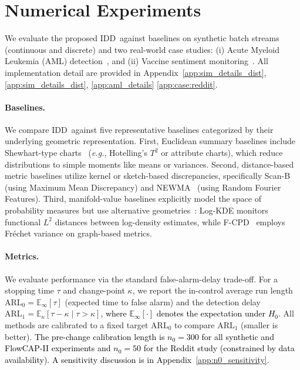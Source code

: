 \documentclass{article}
\newcommand{\eg}{\textit{e.g.}, \xspace}
\newcommand{\algoname}{\textsc{IDD}\xspace}
\newcommand{\rev}[1]{\textcolor{black}{#1}}
\theoremstyle{plain}
\theoremstyle{definition}
\theoremstyle{remark}
\begin{document}
\section{Numerical Experiments}
We evaluate the proposed \algoname\ against baselines on synthetic batch streams (continuous and discrete) and two real-world case studies: (i) Acute Myeloid Leukemia (AML) detection~\citep{aghaeepour2013critical}, and (ii) Vaccine sentiment monitoring~\citep{DVN/XJTBQM_2022}. 
All implementation detail are provided in Appendix~\ref{app:sim_details_dist}, \ref{app:sim_details_dist}, \ref{app:aml_details} \ref{app:case:reddit}. 

\paragraph{Baselines.}
We compare \algoname\ against five representative baselines categorized by their underlying geometric representation.
First, Euclidean summary baselines include Shewhart-type charts~\citep{xie2021sequential} (\eg Hotelling's $T^2$ or attribute charts), which reduce distributions to simple moments like means or variances.
Second, distance-based metric baselines utilize kernel or sketch-based discrepancies, specifically Scan-B~\citep{li2019scan} (using Maximum Mean Discrepancy) and NEWMA~\citep{keriven2020newma} (using Random Fourier Features).
Third, manifold-value baselines explicitly model the space of probability measures but use alternative geometries~\citep{ramsay2005functional}: Log-KDE monitors functional $L^2$ distances between log-density estimates, while F-CPD~\citep{dubey2020frechet} employs Fr\'echet variance on graph-based metrics.

\paragraph{Metrics.} We evaluate performance via the standard false-alarm-delay trade-off.
For a stopping time $\tau$ and change-point $\kappa$, we report the in-control average run length $\mathrm{ARL}_0=\mathbb E_{\infty}[\tau]$ (expected time to false alarm) and the detection delay $\mathrm{ARL}_1=\mathbb E_{\kappa}[\tau-\kappa\mid \tau>\kappa]$\rev{, where $\mathbb E_{\infty}[\cdot]$ denotes the 
expectation under $H_0$}.
All methods are calibrated to a fixed target $\mathrm{ARL}_0$ to compare $\mathrm{ARL}_1$ (smaller is better).
\rev{The pre-change calibration length is $n_0=300$ for all synthetic and FlowCAP-II experiments and $n_0=50$ for the Reddit study (constrained by data availability). A sensitivity discussion is in Appendix~\ref{app:n0_sensitivity}.}
\end{document}

